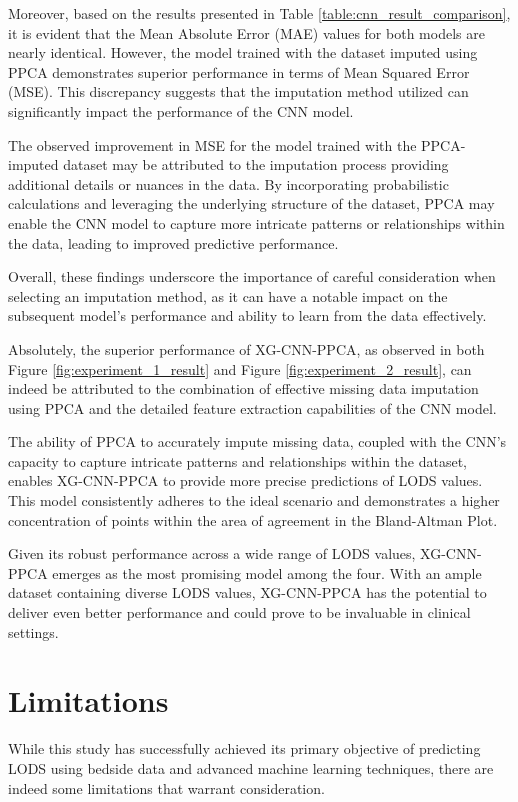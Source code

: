 \documentclass[12pt,a4paper,english
]{tunithesis}
\begin{document}
Moreover, based on the results presented in Table \ref{table:cnn_result_comparison}, it is evident that the Mean Absolute Error (MAE) values for both models are nearly identical. However, the model trained with the dataset imputed using PPCA demonstrates superior performance in terms of Mean Squared Error (MSE). This discrepancy suggests that the imputation method utilized can significantly impact the performance of the CNN model.

The observed improvement in MSE for the model trained with the PPCA-imputed dataset may be attributed to the imputation process providing additional details or nuances in the data. By incorporating probabilistic calculations and leveraging the underlying structure of the dataset, PPCA may enable the CNN model to capture more intricate patterns or relationships within the data, leading to improved predictive performance.

Overall, these findings underscore the importance of careful consideration when selecting an imputation method, as it can have a notable impact on the subsequent model's performance and ability to learn from the data effectively.

Absolutely, the superior performance of XG-CNN-PPCA, as observed in both Figure \ref{fig:experiment_1_result} and Figure \ref{fig:experiment_2_result}, can indeed be attributed to the combination of effective missing data imputation using PPCA and the detailed feature extraction capabilities of the CNN model.

The ability of PPCA to accurately impute missing data, coupled with the CNN's capacity to capture intricate patterns and relationships within the dataset, enables XG-CNN-PPCA to provide more precise predictions of LODS values. This model consistently adheres to the ideal scenario and demonstrates a higher concentration of points within the area of agreement in the Bland-Altman Plot.

Given its robust performance across a wide range of LODS values, XG-CNN-PPCA emerges as the most promising model among the four. With an ample dataset containing diverse LODS values, XG-CNN-PPCA has the potential to deliver even better performance and could prove to be invaluable in clinical settings.

\section{Limitations}
While this study has successfully achieved its primary objective of predicting LODS using bedside data and advanced machine learning techniques, there are indeed some limitations that warrant consideration.
\end{document}
